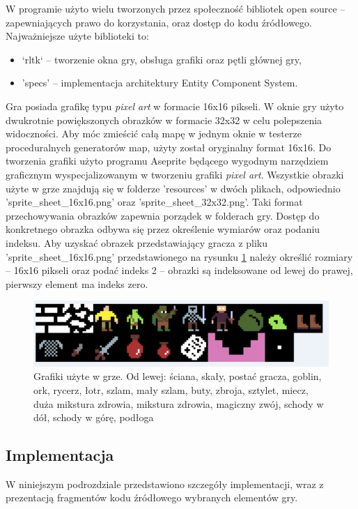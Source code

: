 \documentclass[12pt,twoside]{article}
\begin{document}
W programie użyto wielu tworzonych przez społeczność bibliotek open source -- zapewniających prawo do korzystania, oraz dostęp do kodu źródłowego. Najważniejsze użyte biblioteki to:
\begin{itemize}
	\item `rltk` -- tworzenie okna gry, obsługa grafiki oraz pętli głównej gry,
	\item 'specs' -- implementacja architektury Entity Component System.
\end{itemize}

Gra posiada grafikę typu \emph{pixel art} w formacie 16x16 pikseli. W oknie gry użyto dwukrotnie powiększonych obrazków w formacie 32x32 w celu polepszenia widoczności. Aby móc zmieścić całą mapę w jednym oknie w testerze proceduralnych generatorów map, użyty został oryginalny format 16x16. Do tworzenia grafiki użyto programu Aseprite \cite{aseprite} będącego wygodnym narzędziem graficznym wyspecjalizowanym w tworzeniu grafiki \emph{pixel art}. Wszystkie obrazki użyte w grze znajdują się w folderze 'resources' w dwóch plikach, odpowiednio 'sprite\_sheet\_16x16.png' oraz 'sprite\_sheet\_32x32.png'. Taki format przechowywania obrazków zapewnia porządek w folderach gry. Dostęp do konkretnego obrazka odbywa się przez określenie wymiarów oraz podaniu indeksu. Aby uzyskać obrazek przedstawiający gracza z pliku 'sprite\_sheet\_16x16.png' przedstawionego na rysunku \ref{mygame:spritesheet} należy określić rozmiary -- 16x16 pikseli oraz podać indeks 2 -- obrazki są indeksowane od lewej do prawej, pierwszy element ma indeks zero.

\FloatBarrier
\begin{figure}[ht]
	\centering
	\includegraphics[width=12cm]{images/mygame/spritesheet.png}
	\caption{Grafiki użyte w grze. Od lewej: ściana, skały, postać gracza, goblin, ork, rycerz, łotr, szlam, mały szlam, buty, zbroja, sztylet, miecz, duża mikstura zdrowia, mikstura zdrowia, magiczny zwój, schody w dół, schody w górę, podłoga}
	\label{mygame:spritesheet}
\end{figure}
\FloatBarrier

\subsection{Implementacja}
W niniejszym podrozdziale przedstawiono szczegóły implementacji, wraz z prezentacją fragmentów kodu źródłowego wybranych elementów gry.
\end{document}
